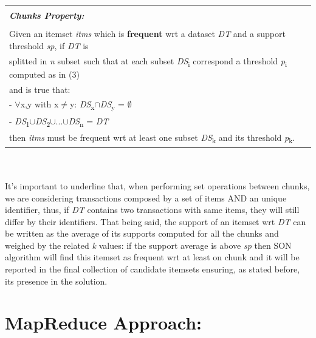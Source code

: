 \documentclass[]{report}
\begin{document}
	\begin{tabular}{ | l | }
		\hline \vspace{-3mm}\\
		\textbf{\textit{Chunks Property:}}\\
		\hline \vspace{-3mm}\\
		Given an itemset \textit{itms} which is \textbf{frequent} wrt a dataset \textit{DT} and a support threshold \textit{sp}, if \textit{DT} is\\ 
		splitted in \textit{n} subset such that at each subset \textit{DS}\textsubscript{i} correspond a threshold \textit{p}\textsubscript{i} computed as in (3)\\ and is true that:\\
		- $\forall$x,y  with x$\ne$y: \textit{DS}\textsubscript{x}$\cap$\textit{DS}\textsubscript{y} = $\emptyset$\\
		- \textit{DS}\textsubscript{1}$\cup$\textit{DS}\textsubscript{2}$\cup$...$\cup$\textit{DS}\textsubscript{n} = \textit{DT}
			\\ then \textit{itms} must be frequent wrt at least one subset \textit{DS}\textsubscript{k} and its threshold \textit{p}\textsubscript{k}.\\ 
		\hline	    
	\end{tabular}            
	\\ \vspace{3mm}
	\\
	It's important to underline that, when performing set operations between chunks, we are considering transactions composed by a set of items AND an unique identifier, thus, if \textit{DT} contains two transactions with same items, they will still differ by their identifiers.
	That being said, the support of an itemset wrt \textit{DT} can be written as the average of its supports computed for all the chunks and weighed by the related \textit{k} values: if the support average is above \textit{sp} then SON algorithm will find this itemset as frequent wrt at least on chunk and it will be reported in the final collection of candidate itemsets ensuring, as stated before, its presence in the solution.
	 
\section*{MapReduce Approach:}
	
\end{document}
